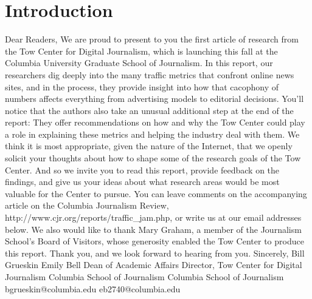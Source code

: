 \chapter{Introduction}
Dear Readers,
We are proud to present to you the first article of research from the Tow Center
for Digital Journalism, which is launching this fall at the Columbia University
Graduate School of Journalism.
In this report, our researchers dig deeply into the many traffic metrics that
confront online news sites, and in the process, they provide insight into how that
cacophony of numbers affects everything from advertising models to editorial
decisions.
You’ll notice that the authors also take an unusual additional step at the end of
the report: They offer recommendations on how and why the Tow Center could
play a role in explaining these metrics and helping the industry deal with them.
We think it is most appropriate, given the nature of the Internet, that we openly
solicit your thoughts about how to shape some of the research goals of the Tow
Center. And so we invite you to read this report, provide feedback on the
findings, and give us your ideas about what research areas would be most
valuable for the Center to pursue. You can leave comments on the accompanying
article on the Columbia Journalism Review, http://www.cjr.org/reports/traffic_jam.php, or write us at our email addresses below.
We also would like to thank Mary Graham, a member of the Journalism School’s
Board of Visitors, whose generosity enabled the Tow Center to produce this
report.
Thank you, and we look forward to hearing from you.
Sincerely,
Bill Grueskin Emily Bell
Dean of Academic Affairs Director, Tow Center for Digital Journalism
Columbia School of Journalism Columbia School of Journalism
bgrueskin@columbia.edu eb2740@columbia.edu

